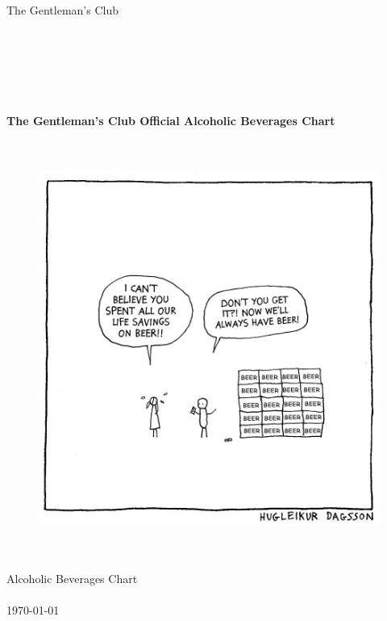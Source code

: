 \documentclass[12pt,a4paper,oneside,norsk]{article}
\begin{document}
    \begin{titlepage}
    \begin{center}
    \ \\
    \ \\
    \ \\
    The Gentleman's Club \\
    \ \\
    \ \\
    \ \\
    \ \\
    \ \\
    \ \\{\large \bfseries
    The Gentleman's Club Official Alcoholic Beverages Chart\\
    }
    \ \\
    \ \\
\begin{figure} [H]
\centering
\includegraphics[scale=0.45]{Bilder/forside.jpg} %
\end{figure}
    \ \\
    \ \\
        {\large
    Alcoholic Beverages Chart\\
    }
    \ \\
    {\today\ \\}
    \ \\
    \end{center}
    \end{titlepage}
    
\end{document}
